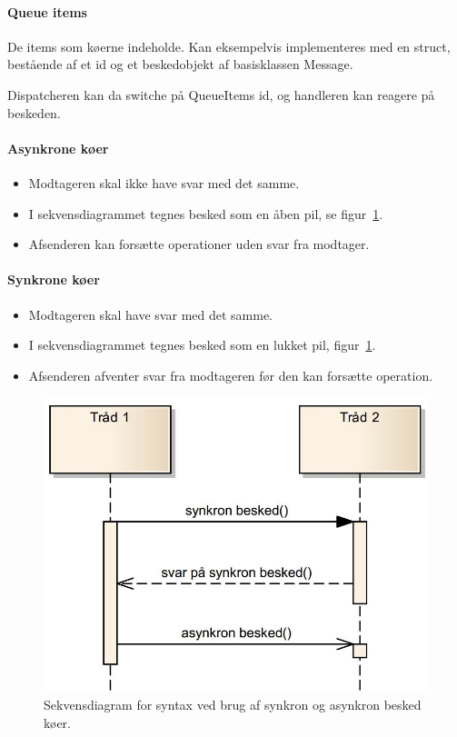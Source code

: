 \paragraph{Queue items}

De items som køerne indeholde. Kan eksempelvis implementeres med en struct, bestående af et id og et beskedobjekt af basisklassen Message.

Dispatcheren kan da switche på QueueItems id, og handleren kan  reagere på beskeden.

\paragraph{Asynkrone køer}
\begin{itemize}
	\item Modtageren skal ikke have svar med det samme.
	\item I sekvensdiagrammet tegnes besked som en åben pil, se figur~\ref{fig:msq_seqdia}.
	\item Afsenderen kan forsætte operationer uden svar fra modtager.
\end{itemize}

\paragraph{Synkrone køer}
\begin{itemize}
	\item Modtageren skal have svar med det samme.
	\item I sekvensdiagrammet tegnes besked som en lukket pil, figur~\ref{fig:msq_seqdia}.
	\item Afsenderen afventer svar fra modtageren før den kan forsætte operation.
\end{itemize}

\begin{figure}[h]
	\centering
	\includegraphics[width=0.6\linewidth]{figs/spm3/msq_seqdia}
	\caption[Syntax for sekvensdiagram med syn -og asynkron msq.]{Sekvensdiagram for syntax ved brug af synkron og asynkron besked køer.}
	\label{fig:msq_seqdia}
\end{figure}

